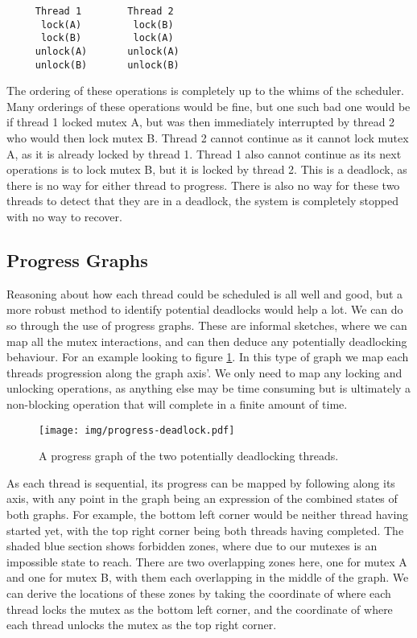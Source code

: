 \begin{minipage}{1.0\linewidth}
  \begin{verbatim}
     Thread 1        Thread 2 
      lock(A)         lock(B)
      lock(B)         lock(A)
     unlock(A)       unlock(A)
     unlock(B)       unlock(B)
  \end{verbatim}
\end{minipage}

The ordering of these operations is completely up to the whims of the scheduler. Many orderings of these operations would be fine, but one such bad one would be if thread 1 locked mutex A, but was then immediately interrupted by thread 2 who would then lock mutex B. Thread 2 cannot continue as it cannot lock mutex A, as it is already locked by thread 1. Thread 1 also cannot continue as its next operations is to lock mutex B, but it is locked by thread 2. This is a deadlock, as there is no way for either thread to progress. There is also no way for these two threads to detect that they are in a deadlock, the system is completely stopped with no way to recover.

\subsection{Progress Graphs}

Reasoning about how each thread could be scheduled is all well and good, but a more robust method to identify potential deadlocks would help a lot. We can do so through the use of progress graphs. These are informal sketches, where we can map all the mutex interactions, and can then deduce any potentially deadlocking behaviour. For an example looking to figure \ref{fig:progress-deadlock}. In this type of graph we map each threads progression along the graph axis'. We only need to map any locking and unlocking operations, as anything else may be time consuming but is ultimately a non-blocking operation that will complete in a finite amount of time.

\begin{figure}
  \centering
  \texttt{[image: img/progress-deadlock.pdf]}
  \caption{A progress graph of the two potentially deadlocking threads.}
  \label{fig:progress-deadlock}
\end{figure}

As each thread is sequential, its progress can be mapped by following along its axis, with any point in the graph being an expression of the combined states of both graphs. For example, the bottom left corner would be neither thread having started yet, with the top right corner being both threads having completed. The shaded blue section shows forbidden zones, where due to our mutexes is an impossible state to reach. There are two overlapping zones here, one for mutex A and one for mutex B, with them each overlapping in the middle of the graph. We can derive the locations of these zones by taking the coordinate of where each thread locks the mutex as the bottom left corner, and the coordinate of where each thread unlocks the mutex as the top right corner.

